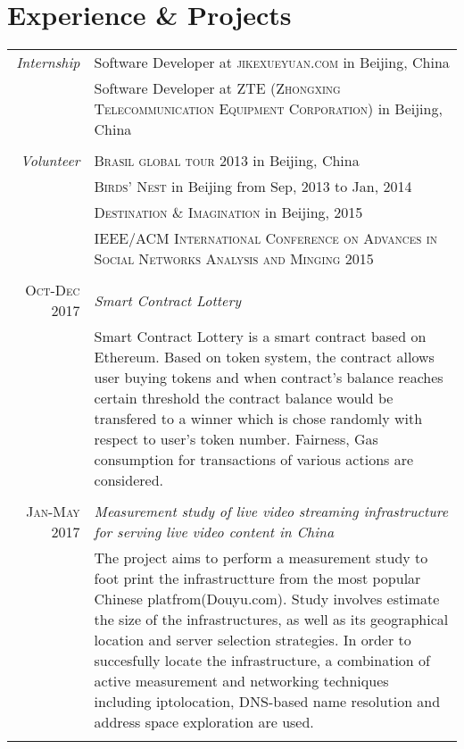 \documentclass[a4paper,10pt]{article}
\begin{document}
\section{Experience \& Projects}
\begin{tabular}{r|p{11cm}}
  \emph{Internship} & Software Developer at \textsc{jikexueyuan.com} in Beijing, China \\
  & Software Developer at \textsc{ZTE (Zhongxing Telecommunication Equipment Corporation)} in Beijing, China\\
  \multicolumn{2}{c}{} \\
  \emph{Volunteer} & \textsc{Brasil global tour 2013} in Beijing, China \\
  & \textsc{Birds' Nest} in Beijing from Sep, 2013 to Jan, 2014\\
  & \textsc{Destination \& Imagination} in Beijing, 2015\\
  & \textsc{IEEE/ACM International Conference on Advances in Social Networks Analysis and Minging 2015}\\
  \multicolumn{2}{c}{} \\

  \textsc{Oct-Dec 2017}&\emph{Smart Contract Lottery}\\
  &\footnotesize{Smart Contract Lottery is a smart contract based on Ethereum. Based on token system, the contract allows user buying tokens and when contract's balance reaches certain threshold the contract balance would be transfered to a winner which is chose randomly with respect to user's token number. Fairness, Gas consumption for transactions of various actions are considered. }\\
  \multicolumn{2}{c}{} \\

  \textsc{Jan-May 2017} & \emph{Measurement study of live video streaming infrastructure for serving
live video content in China} \\
  &\footnotesize{The project aims to perform a measurement study to foot print the infrastructture from the most popular Chinese platfrom(Douyu.com). Study involves estimate the size of the infrastructures, as well as its geographical location and server selection strategies. In order to succesfully locate the infrastructure, a combination of active measurement and networking techniques including iptolocation, DNS-based name resolution and address space exploration are used.}\\
  \multicolumn{2}{c}{} \\


\end{tabular}
\end{document}
